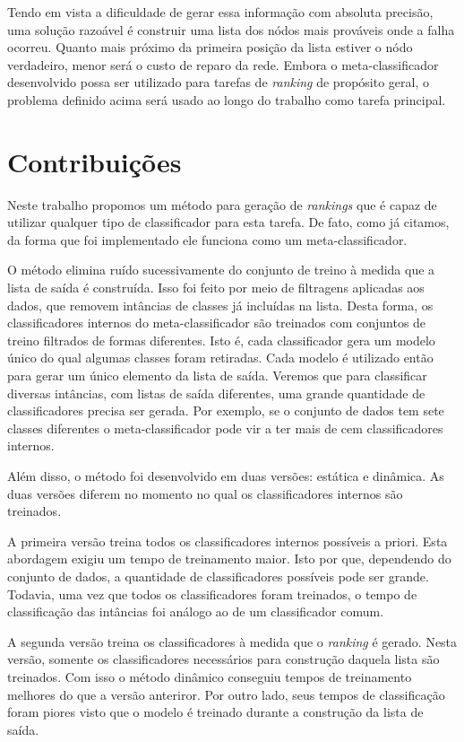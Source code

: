 Tendo em vista a dificuldade de gerar essa informação com absoluta precisão, uma solução razoável é construir uma lista dos nódos mais prováveis onde a falha ocorreu.
Quanto mais próximo da primeira posição da lista estiver o nódo verdadeiro, menor será o custo de reparo da rede.
Embora o meta-classificador desenvolvido possa ser utilizado para tarefas de \textit{ranking} de propósito geral, o problema definido acima será usado ao longo do trabalho como tarefa principal.

\section{Contribuições}

Neste trabalho propomos um método para geração de \textit{rankings} que é capaz de utilizar qualquer tipo de classificador para esta tarefa.
De fato, como já citamos, da forma que foi implementado ele funciona como um meta-classificador.

O método elimina ruído sucessivamente do conjunto de treino à medida que a lista de saída é construída.
Isso foi feito por meio de filtragens aplicadas aos dados, que removem intâncias de classes já incluídas na lista.
Desta forma, os classificadores internos do meta-classificador são treinados com conjuntos de treino filtrados de formas diferentes.
Isto é, cada classificador gera um modelo único do qual algumas classes foram retiradas.
Cada modelo é utilizado então para gerar um único elemento da lista de saída.
Veremos que para classificar diversas intâncias, com listas de saída diferentes, uma grande quantidade de classificadores precisa ser gerada.
Por exemplo, se o conjunto de dados tem sete classes diferentes o meta-classificador pode vir a ter mais de cem classificadores internos.

Além disso, o método foi desenvolvido em duas versões: estática e dinâmica.
As duas versões diferem no momento no qual os classificadores internos são treinados.

A primeira versão treina todos os classificadores internos possíveis a priori.
Esta abordagem exigiu um tempo de treinamento maior.
Isto por que, dependendo do conjunto de dados, a quantidade de classificadores possíveis pode ser grande.
Todavia, uma vez que todos os classificadores foram treinados, o tempo de classificação das intâncias foi análogo ao de um classificador comum.

A segunda versão treina os classificadores à medida que o \textit{ranking} é gerado.
Nesta versão, somente os classificadores necessários para construção daquela lista são treinados.
Com isso o método dinâmico conseguiu tempos de treinamento melhores do que a versão anteriror.
Por outro lado, seus tempos de classificação foram piores visto que o modelo é treinado durante a construção da lista de saída.


